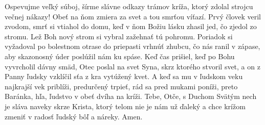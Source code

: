 Ospevujme veľký súboj,
šírme slávne odkazy
trámov kríža, ktorý zdolal
strojcu večnej nákazy!
Obeť na ňom zmiera za svet
a tou smrťou víťazí.
\versseparator
Prvý človek veril zvodom,
smrť si vtiahol do domu,
keď v ňom Božiu lásku zhasil
jed, čo zjedol zo stromu.
Lež Boh nový strom si vybral
zažehnať tú pohromu.
\versseparator
Poriadok si vyžadoval
po bolestnom otrase
do priepasti vrhnúť zhubcu,
čo nás ranil v zápase,
aby skazonosný úder
poslúžil nám ku spáse.
\versseparator
Keď čas prišiel, keď po Bohu
vyvrcholil dávny smäd,
Otec poslal na svet Syna,
skrz ktorého stvoril svet,
a on z Panny ľudsky vzklíčil
sťa z kra vytúžený kvet.
\versseparator
A keď sa mu v ľudskom veku
najkrajší vek priblíži,
predurčený trpieť, rád sa
pred mukami poníži,
preto Baránka, hľa, ľudstvo
v obeť dvíha na kríži.
\versseparator
Tebe, Otče, s Duchom Svätým
nech je sláva naveky
skrze Krista, ktorý telom
nie je nám už ďaleký
a chce krížom zmeniť v radosť
ľudský bôľ a náreky. Amen.
